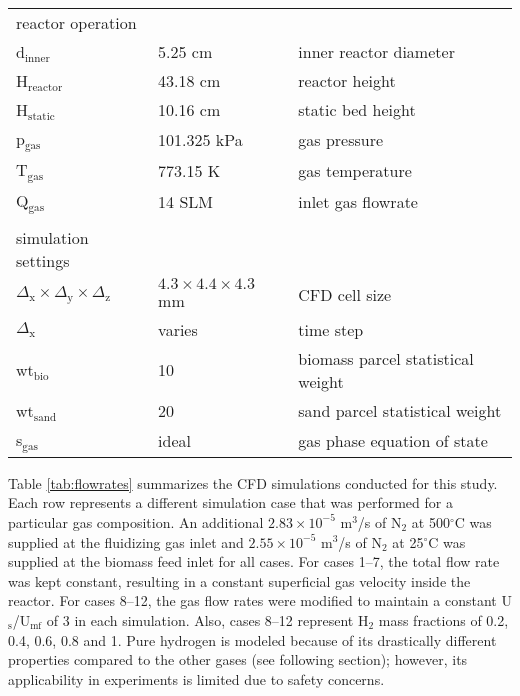 \begin{table}[H]
\begin{tabular}{lll}
        \\
        reactor operation \\
        d$_\text{inner}$      & 5.25 cm       & inner reactor diameter \\
        H$_\text{reactor}$    & 43.18 cm      & reactor height \\
        H$_\text{static}$     & 10.16 cm      & static bed height \\
        p$_\text{gas}$        & 101.325 kPa   & gas pressure \\
        T$_\text{gas}$        & 773.15 K      & gas temperature \\
        Q$_\text{gas}$        & 14 SLM        & inlet gas flowrate \\
        \\
        simulation settings \\
        $\Delta_\text{x} \times \Delta_\text{y} \times \Delta_\text{z}$ & $4.3 \times 4.4 \times 4.3$ mm & CFD cell size \\
        $\Delta_\text{x}$   & varies & time step \\
        wt$_\text{bio}$      & 10     & biomass parcel statistical weight \\
        wt$_\text{sand}$     & 20     & sand parcel statistical weight \\
        s$_\text{gas}$               & ideal  & gas phase equation of state \\
        \bottomrule
    \end{tabular}
\end{table}

Table \ref{tab:flowrates} summarizes the CFD simulations conducted for this study. Each row represents a different simulation case that was performed for a particular gas composition. An additional $2.83\times10^{-5}$ m$^3$/s of N$_2$ at 500$^\circ$C was supplied at the fluidizing gas inlet and $2.55\times10^{-5}$ m$^3$/s of N$_2$ at 25$^\circ$C was supplied at the biomass feed inlet for all cases. For cases 1--7, the total flow rate was kept constant, resulting in a constant superficial gas velocity inside the reactor. For cases 8--12, the gas flow rates were modified to maintain a constant U$_\text{s}$/U$_\text{mf}$ of 3 in each simulation. Also, cases 8--12 represent H$_2$ mass fractions of 0.2, 0.4, 0.6, 0.8 and 1. Pure hydrogen is modeled because of its drastically different properties compared to the other gases (see following section); however, its applicability in experiments is limited due to safety concerns.

